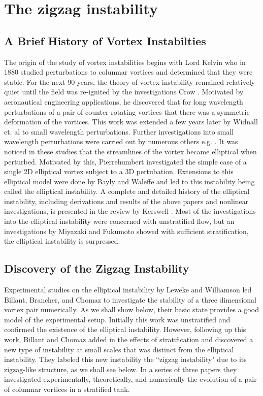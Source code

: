 \section{The zigzag instability}
\subsection{A Brief History of Vortex Instabilties}

The origin of the study of vortex instabilities begins with Lord Kelvin who in 1880 studied perturbations to columnar vortices and determined that they were stable. For the next 90 years, the theory of vortex instability remained relatively quiet until the field was re-ignited by the investigations Crow \cite{crow1970}. Motivated by aeronautical engineering applications, he discovered that for long wavelength perturbations of a pair of counter-rotating vortices that there was a symmetric deformation of the vortices. This work was extended a few years later by Widnall et. al \cite{widnall1974} to small wavelength perturbations. Further investigations into small wavelength perturbations were carried out by numerous others e.g. \cite{moore1975,tsai1976}. It was noticed in these studies that the streamlines of the vortex became elliptical when perturbed. Motivated by this, Pierrehumbert \cite{pierrehumbert1986} investigated the simple case of a single 2D elliptical vortex subject to a 3D pertubation. Extensions to this elliptical model were done by Bayly \cite{bayly1986} and Waleffe \cite{waleffe1990} and led to this instability being called the elliptical instability. A complete and detailed history of the elliptical instability, including derivations and results of the above papers and nonlinear investigations, is presented in the review by Kerswell \cite{kerswell2002}. Most of the investigations into the elliptical instability were concerned with unstratified flow, but an investigations by Miyazaki and Fukumoto \cite{miyazakifukumoto1992} showed with sufficient stratification, the elliptical instability is surpressed. 

\subsection{Discovery of the Zigzag Instability}
Experimental studies  on the elliptical instability by Leweke and Williamson \cite{leweke1998} led Billant, Brancher, and Chomaz \cite{bc1999} to investigate the stability of a three dimensional vortex pair numerically. As we shall show below, their basic state provides a good model of the experimental setup. Initially this work was unstratified and confirmed the existence of the elliptical instability. However, following up this work, Billant and Chomaz added in the effects of stratification and discovered a new type of instability at small scales that was distinct from the elliptical instability. They labeled this new instability the ``zigzag instability" due to its zigzag-like structure, as we shall see below. In a series of three papers they investigated experimentally\cite{bc2000a}, theoretically\cite{bc2000b}, and numerically \cite{bc2000c} the evolution of a pair of columnar vortices in a stratified tank.

